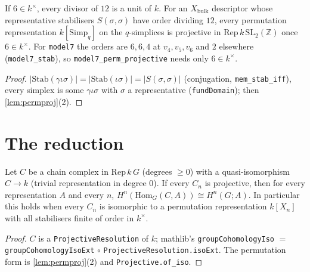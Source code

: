 \begin{lemma}\label{lem:xbulk-permproj}
  \leanok
  If $6\in k^\times$, every divisor of $12$ is a unit of $k$. For an $X_{\mathrm{bulk}}$ descriptor whose representative
  stabilisers $S(\sigma,\sigma)$ have order dividing $12$, every permutation representation $k[\mathrm{Simp}_q]$ on the
  $q$-simplices is projective in $\mathrm{Rep}\,k\,\mathrm{SL}_2(\mathbb Z)$ once $6\in k^\times$. For
  \texttt{model7} the orders are $6,6,4$ at $v_4,v_5,v_6$ and $2$ elsewhere (\texttt{model7\_stab}), so
  \texttt{model7\_perm\_projective} needs only $6\in k^\times$.
\end{lemma}
\begin{proof}
  \leanok
  $|\mathrm{Stab}(\gamma\iota\sigma)|=|\mathrm{Stab}(\iota\sigma)|=|S(\sigma,\sigma)|$ (conjugation, \texttt{mem\_stab\_iff}),
  every simplex is some $\gamma\iota\sigma$ with $\sigma$ a representative (\texttt{fundDomain}); then \ref{lem:permproj}(2).
\end{proof}

\section{The reduction}

\begin{theorem}\label{thm:projred}
  \leanok
  Let $C$ be a chain complex in $\mathrm{Rep}\,k\,G$ (degrees $\ge0$) with a quasi-isomorphism $C\to k$ (trivial
  representation in degree $0$). If every $C_n$ is projective, then for every representation $A$ and every $n$,
  $H^n(\mathrm{Hom}_G(C,A))\cong H^n(G;A)$. In particular this holds when every $C_n$ is isomorphic to a permutation
  representation $k[X_n]$ with all stabilisers finite of order in $k^\times$.
\end{theorem}
\begin{proof}
  \leanok
  $C$ is a \texttt{ProjectiveResolution} of $k$; mathlib's \texttt{groupCohomologyIso} $=$
  \texttt{groupCohomologyIsoExt} $\circ$ \texttt{ProjectiveResolution.isoExt}. The permutation form is
  \ref{lem:permproj}(2) and \texttt{Projective.of\_iso}.
\end{proof}

